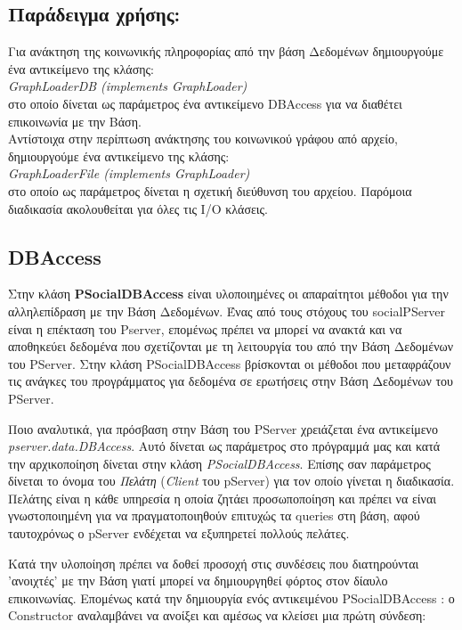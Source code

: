 \subsection*{Παράδειγμα χρήσης:}
\noindent
Για ανάκτηση της κοινωνικής πληροφορίας από την βάση Δεδομένων δημιουργούμε ένα αντικείμενο της κλάσης:\\  \emph{GraphLoaderDB (implements GraphLoader)} \\
στο οποίο δίνεται ως παράμετρος ένα αντικείμενο DBAccess για να διαθέτει επικοινωνία με την Βάση.\\
Αντίστοιχα στην περίπτωση ανάκτησης του κοινωνικού γράφου από αρχείο, δημιουργούμε ένα αντικείμενο της κλάσης:\\
 \emph{GraphLoaderFile (implements GraphLoader)}  \\
στο οποίο ως παράμετρος δίνεται η σχετική διεύθυνση του αρχείου. 
Παρόμοια διαδικασία ακολουθείται για όλες τις I/O κλάσεις.  



\subsection{DBAccess}
\label{DBAccess}

\noindent
Στην κλάση \textbf{PSocialDBAccess} είναι υλοποιημένες οι απαραίτητοι μέθοδοι για την
αλληλεπίδραση με την Βάση Δεδομένων.
Ένας από τους στόχους του socialPServer είναι η επέκταση του Pserver, 
 επομένως πρέπει να μπορεί να ανακτά και να αποθηκεύει δεδομένα που σχετίζονται 
  με τη λειτουργία του από την Βάση Δεδομένων του PServer.
Στην κλάση PSocialDBAccess βρίσκονται οι μέθοδοι που μεταφράζουν τις ανάγκες του προγράμματος για δεδομένα
  σε ερωτήσεις στην Βάση Δεδομένων του PServer.
  
Ποιο αναλυτικά, για πρόσβαση στην Βάση του PServer χρειάζεται ένα αντικείμενο \emph{pserver.data.DBAccess}.
Αυτό δίνεται ως παράμετρος στο πρόγραμμά μας και κατά την αρχικοποίηση δίνεται στην κλάση \emph{PSocialDBAccess}. 
Επίσης σαν παράμετρος δίνεται το όνομα του \emph{Πελάτη} (\emph{Client} του pServer) για τον οποίο γίνεται η διαδικασία. 
Πελάτης είναι η κάθε υπηρεσία η οποία ζητάει προσωποποίηση και πρέπει να είναι γνωστοποιημένη για να πραγματοποιηθούν επιτυχώς τα queries στη βάση,
 αφού ταυτοχρόνως ο pServer ενδέχεται να εξυπηρετεί πολλούς πελάτες. 

Κατά την υλοποίηση πρέπει να δοθεί προσοχή στις συνδέσεις που διατηρούνται 'ανοιχτές' με την Βάση γιατί μπορεί να δημιουργηθεί φόρτος στον δίαυλο επικοινωνίας.
Επομένως κατά την δημιουργία ενός αντικειμένου   PSocialDBAccess :
ο Constructor αναλαμβάνει να ανοίξει και αμέσως να κλείσει μια πρώτη σύνδεση:\\\\


